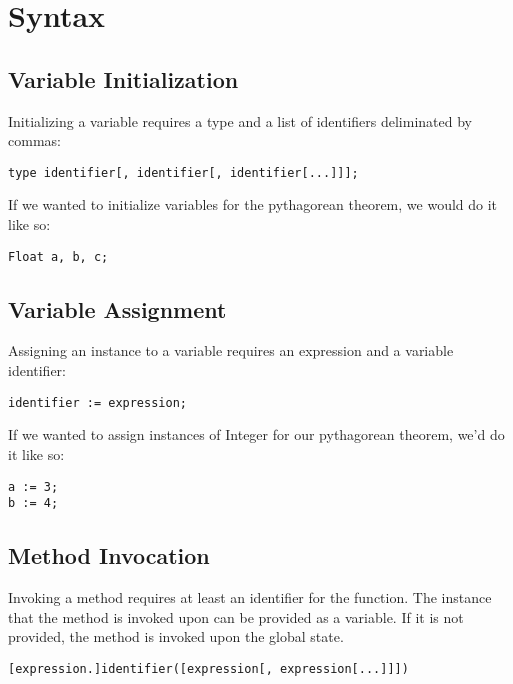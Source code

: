 \section{Syntax}
\subsection{Variable Initialization}
Initializing a variable requires a type and a list of identifiers deliminated by commas:

\begin{lstlisting}
type identifier[, identifier[, identifier[...]]];
\end{lstlisting}

If we wanted to initialize variables for the pythagorean theorem, we would do it like so:

\begin{lstlisting}[caption=Variable Initialization for the Pythagorean Theorem]
Float a, b, c;
\end{lstlisting}

\subsection{Variable Assignment}
Assigning an instance to a variable requires an expression and a variable identifier:

\begin{lstlisting}
identifier := expression;
\end{lstlisting}

If we wanted to assign instances of Integer for our pythagorean theorem, we'd do it like so:

\begin{lstlisting}[caption=Variable Assignment for the Pythagorean Theorem]
a := 3;
b := 4;
\end{lstlisting}

\subsection{Method Invocation}
Invoking a method requires at least an identifier for the function. The instance that the method is invoked upon can be provided as a variable. If it is not provided, the method is invoked upon the global state.

\begin{lstlisting}
[expression.]identifier([expression[, expression[...]]])
\end{lstlisting}

